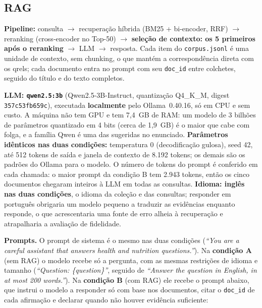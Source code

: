 \documentclass[10pt,a4paper]{article}
\begin{document}
\subsection{RAG}

\textbf{Pipeline:} consulta $\to$ recuperação híbrida (BM25 + bi-encoder, RRF) $\to$ reranking (cross-encoder no Top-50) $\to$ \textbf{seleção de contexto: os 5 primeiros após o reranking} $\to$ LLM $\to$ resposta. Cada item do \texttt{corpus.jsonl} é uma unidade de contexto, sem chunking, o que mantém a correspondência direta com os qrels; cada documento entra no prompt com seu \texttt{doc\_id} entre colchetes, seguido do título e do texto completos.

\textbf{LLM: \texttt{qwen2.5:3b}} (Qwen2.5-3B-Instruct, quantização Q4\_K\_M, digest \texttt{357c53fb659c}), executada \textbf{localmente} pelo Ollama~0.40.16, só em CPU e sem custo. A máquina não tem GPU e tem 7,4~GB de RAM: um modelo de 3 bilhões de parâmetros quantizado em 4 bits (cerca de 1,9~GB) é o maior que cabe com folga, e a família Qwen é uma das sugeridas no enunciado. \textbf{Parâmetros idênticos nas duas condições:} temperatura 0 (decodificação gulosa), seed 42, até 512 tokens de saída e janela de contexto de 8.192 tokens; os demais são os padrões do Ollama para o modelo. O número de tokens do prompt é conferido em cada chamada: o maior prompt da condição B tem 2.943 tokens, então os cinco documentos chegaram inteiros à LLM em todas as consultas. \textbf{Idioma: inglês nas duas condições}, o idioma da coleção e das consultas; responder em português obrigaria um modelo pequeno a traduzir as evidências enquanto responde, o que acrescentaria uma fonte de erro alheia à recuperação e atrapalharia a avaliação de fidelidade.

\textbf{Prompts.} O prompt de sistema é o mesmo nas duas condições (\emph{``You are a careful assistant that answers health and nutrition questions.''}). Na \textbf{condição A} (sem RAG) o modelo recebe só a pergunta, com as mesmas restrições de idioma e tamanho (\emph{``Question: \{question\}''}, seguido de \emph{``Answer the question in English, in at most 200 words.''}). Na \textbf{condição B} (com RAG) ele recebe o prompt abaixo, que instrui o modelo a responder só com base nos documentos, citar o \texttt{doc\_id} de cada afirmação e declarar quando não houver evidência suficiente:
\end{document}
